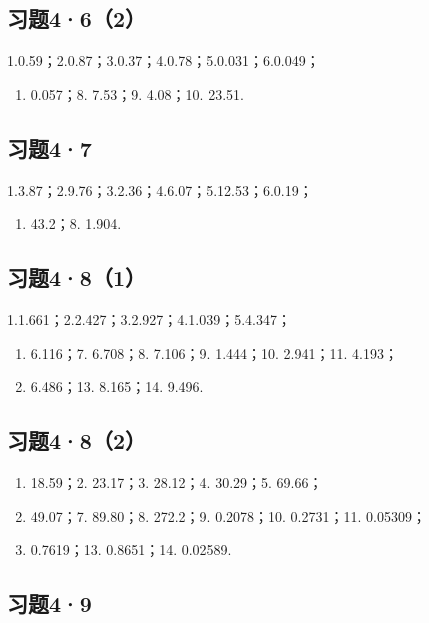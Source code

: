 \subsection{习题4·6（2）}

1.0.59；2.0.87；3.0.37；4.0.78；5.0.031；6.0.049；

\begin{enumerate}[start=7]
\item
  0.057；8. 7.53；9. 4.08；10. 23.51.
\end{enumerate}

\subsection{习题4·7}

1.3.87；2.9.76；3.2.36；4.6.07；5.12.53；6.0.19；

\begin{enumerate}[start=7]
\item
  43.2；8. 1.904.
\end{enumerate}

\subsection{习题4·8（1）}

1.1.661；2.2.427；3.2.927；4.1.039；5.4.347；

\begin{enumerate}[start=6]
\item
  6.116；7. 6.708；8. 7.106；9. 1.444；10. 2.941；11. 4.193；
\item
  6.486；13. 8.165；14. 9.496.
\end{enumerate}

\subsection{习题4·8（2）}

\begin{enumerate}
\item
  18.59；2. 23.17；3. 28.12；4. 30.29；5. 69.66；
\item
  49.07；7. 89.80；8. 272.2；9. 0.2078；10. 0.2731；11. 0.05309；
\item
  0.7619；13. 0.8651；14. 0.02589.
\end{enumerate}

\subsection{习题4·9}

